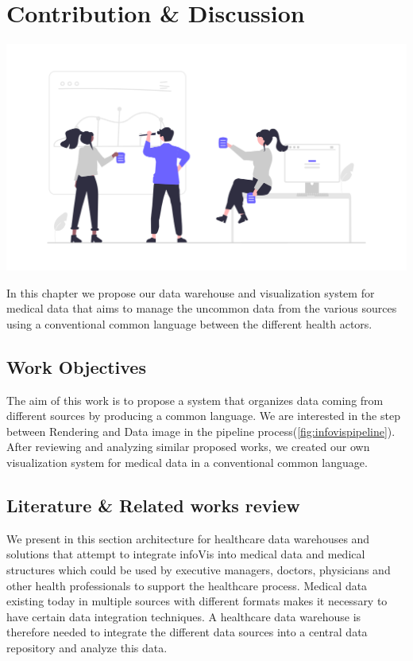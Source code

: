 \chapter{Contribution \& Discussion}
\renewcommand{\thesection}{\arabic{section}}
		




\label{chapitre4}
		
		\includegraphics [width=1 \linewidth, height=0.8\textheight, keepaspectratio] {images/chaptersFigures/contribution.png}
		
	
		
    \newpage
    \thispagestyle{plain}

In this chapter we propose our data warehouse and visualization system for medical data that aims to manage the uncommon data from the various sources using a conventional common language between the different health actors.




\section{Work Objectives}
The aim of this work is to propose a system that organizes data coming from different sources by producing a common language. We are interested in the step between Rendering and Data image in the pipeline process(\ref{fig:infovispipeline}). After reviewing and analyzing similar proposed works, we created our own visualization system for medical data in a conventional common language.



\section{Literature \& Related works review}
We present in this section architecture for healthcare data warehouses and solutions that attempt to integrate infoVis into medical data and medical structures which could be used by executive managers, doctors, physicians and other health professionals to support the healthcare process.  Medical data existing today in multiple sources with different formats makes it necessary to have certain data integration techniques. A healthcare data warehouse is therefore needed to integrate the different data sources into a central data repository and analyze this data.
\bigbreak

